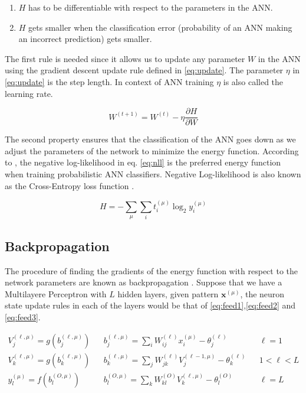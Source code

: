 \begin{enumerate}
    \item $H$ has to be differentiable with respect to the parameters in the ANN.
    \item $H$ gets smaller when the classification error (probability of an ANN making an incorrect prediction) gets smaller.
\end{enumerate}

The first rule is needed since it allows us to update any parameter $W$ in the ANN using the gradient descent update rule defined in \eqref{eq:update}. The parameter $\eta$ in \eqref{eq:update} is the step length. In context of ANN training $\eta$ is also called the learning rate.

\begin{equation}
    \label{eq:update}
    W^{(t+1)} = W^{(t)} - \eta \frac{\partial H}{\partial W}
\end{equation}

The second property ensures that the classification of the ANN goes down as we adjust the parameters of the network to minimize the energy function. According to \cite{mehligcourseslides,lakshminarayanan2017simple,quinonero2006evaluating}, the negative log-likelihood in eq. \eqref{eq:nll} is the preferred energy function when training probabilistic ANN classifiers. Negative Log-likelihood is also known as the Cross-Entropy loss function \cite{quinonero2006evaluating}.

\begin{equation}
    \label{eq:nll}
    H = -\sum_{\mu}\sum_it_i^{(\mu)}\log_2y_i^{(\mu)}
\end{equation}

\subsection{Backpropagation}

\label{sect:backprop}

The procedure of finding the gradients of the energy function with respect to the network parameters are known as backpropagation \cite{lecun1988theoretical}. 
Suppose that we have a Multilayere Perceptron with $L$ hidden layers, given pattern $\bm{x}^{(\mu)}$, the neuron state update rules in each of the layers would be that of \eqref{eq:feed1},\eqref{eq:feed2} and \eqref{eq:feed3}.

\begin{align}
    V^{(\ell,\mu)}_j = g(b_j^{(\ell,\mu)}) && b_j^{(\ell,\mu)} = \sum_i W^{(\ell)}_{ij}x^{(\mu)}_i - \theta_j^{(\ell)}&&\ell = 1\label{eq:feed1}\\
    V^{(\ell,\mu)}_k = g(b_k^{(\ell,\mu)}) && b_k^{(\ell,\mu)} = \sum_j W^{(\ell)}_{jk}V_j^{(\ell-1,\mu)} - \theta^{(\ell)}_k && 1 < \ell < L \label{eq:feed2}\\
    y_l^{(\mu)} = f(b_l^{(O,\mu)}) && b_l^{(O,\mu)} = \sum_k W^{(O)}_{kl}V_k^{(\ell,\mu)}-\theta^{(O)}_l && \ell = L \label{eq:feed3}
\end{align}

